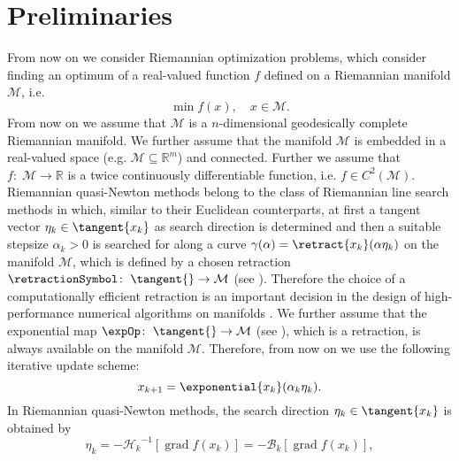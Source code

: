 \section{Preliminaries}

From now on we consider Riemannian optimization problems, which consider finding an optimum of a real-valued function $f$ defined on a Riemannian manifold $\mathcal{M}$, i.e.
\begin{equation*}
    \min f(x), \quad x \in \mathcal{M}.
\end{equation*}
From now on we assume that $\mathcal{M}$ is a $n$-dimensional geodesically complete Riemannian manifold. We further assume that the manifold $\mathcal{M}$ is embedded in a real-valued space (e.g. $\mathcal{M} \subseteq \mathbb{R}^m$) and connected. Further we assume that $f \colon \; \mathcal{M} \to \mathbb{R}$ is a twice continuously differentiable function, i.e. $f \in C^2(\mathcal{M})$. \\
Riemannian quasi-Newton methods belong to the class of Riemannian line search methods in which, similar to their Euclidean counterparts, at first a tangent vector $\eta_k \in \tangent{x_k}$ as search direction is determined and then a suitable stepsize $\alpha_k > 0$ is searched for along a curve $\gamma(\alpha) = \retract{x_k}(\alpha \eta_k)$ on the manifold $\mathcal{M}$, which is defined by a chosen retraction $\retractionSymbol \colon \; \tangent{} \to \mathcal{M}$ (see \cite[Definition~4.1.1]{AbsilMahonySepulchre:2008}). Therefore the choice of a computationally efficient retraction is an important decision in the design of high-performance numerical algorithms on manifolds \cite[p.~54]{AbsilMahonySepulchre:2008}. We further assume that the exponential map $\expOp \colon \; \tangent{} \to \mathcal{M}$ (see \cite[p.~102-103]{AbsilMahonySepulchre:2008}), which is a retraction, is always available on the manifold $\mathcal{M}$. Therefore, from now on we use the following iterative update scheme:
\begin{equation*}
    x_{k+1} = \exponential{x_k}(\alpha_k \eta_k).
\end{equation*}
In Riemannian quasi-Newton methods, the search direction $\eta_k \in \tangent{x_k}$ is obtained by 
\begin{equation*}
    \eta_k = -{\mathcal{H}_k}^{-1}[\operatorname{grad} f(x_k)] = -\mathcal{B}_k [\operatorname{grad} f(x_k)],
\end{equation*}
